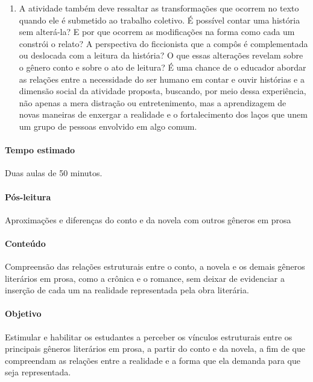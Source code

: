 \documentclass[12pt]{extarticle}
\begin{document}
\begin{enumerate}
\item
A atividade também deve ressaltar as transformações que ocorrem no
texto quando ele é submetido ao trabalho coletivo. É possível contar uma
história sem alterá-la? E por que ocorrem as modificações na forma como
cada um constrói o relato? A perspectiva do ficcionista que a compôs é
complementada ou deslocada com a leitura da história? O que essas
alterações revelam sobre o gênero conto e sobre o ato de leitura? É uma
chance de o educador abordar as relações entre a necessidade do ser
humano em contar e ouvir histórias e a dimensão social da atividade
proposta, buscando, por meio dessa experiência, não apenas a mera
distração ou entretenimento, mas a aprendizagem de novas maneiras de
enxergar a realidade e o fortalecimento dos laços que unem um grupo de
pessoas envolvido em algo comum.
\end{enumerate}

\paragraph{Tempo estimado} Duas aulas de 50 minutos.



\paragraph{Pós-leitura} Aproximações e diferenças do conto e da novela 
com outros gêneros em prosa 



\paragraph{Conteúdo} Compreensão das relações estruturais entre o conto, a
novela e os demais gêneros literários em prosa, como a crônica e o
romance, sem deixar de evidenciar a inserção de cada um na realidade
representada pela obra literária.

\paragraph{Objetivo} Estimular e habilitar os estudantes a perceber os
vínculos estruturais entre os principais gêneros literários em prosa, a
partir do conto e da novela, a fim de que compreendam as relações entre
a realidade e a forma que ela demanda para que seja representada.
\end{document}
